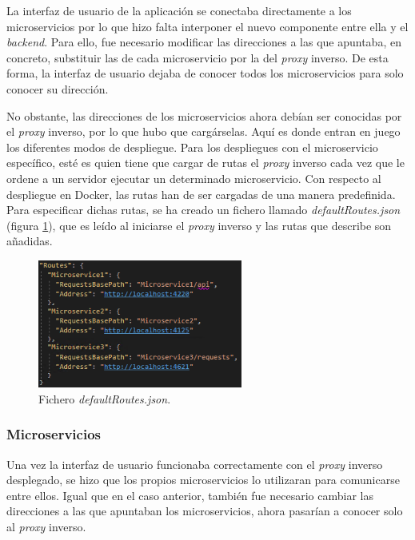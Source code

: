 \documentclass[11pt,spanish,listoffigures]{tfgetsinf}
\begin{document}
La interfaz de usuario de la aplicación se conectaba directamente a los microservicios por lo que hizo falta interponer el nuevo componente entre ella y el \emph{backend}. Para ello, fue necesario modificar las direcciones a las que apuntaba, en concreto, substituir las de cada microservicio por la del \emph{proxy} inverso. De esta forma, la interfaz de usuario dejaba de conocer todos los microservicios para solo conocer su dirección.

No obstante, las direcciones de los microservicios ahora debían ser conocidas por el \emph{proxy} inverso, por lo que hubo que cargárselas. Aquí es donde entran en juego los diferentes modos de despliegue. Para los despliegues con el microservicio específico, esté es quien tiene que cargar de rutas el \emph{proxy} inverso cada vez que le ordene a un servidor ejecutar un determinado microservicio. Con respecto al despliegue en Docker, las rutas han de ser cargadas de una manera predefinida. Para especificar dichas rutas, se ha creado un fichero llamado \emph{defaultRoutes.json} (figura \ref{defaultRoutes}), que es leído al iniciarse el \emph{proxy} inverso y las rutas que describe son añadidas.

\begin{figure}[ht]
\centering
\includegraphics[width=0.6\textwidth]{imagenes/defaultRoutes}
\caption{Fichero \emph{defaultRoutes.json}.}
	\label{defaultRoutes}
\end{figure}


			\subsubsection{Microservicios}

Una vez la interfaz de usuario funcionaba correctamente con el \emph{proxy} inverso desplegado, se hizo que los propios microservicios lo utilizaran para comunicarse entre ellos. Igual que en el caso anterior, también fue necesario cambiar las direcciones a las que apuntaban los microservicios, ahora pasarían a conocer solo al \emph{proxy} inverso.
\end{document}
